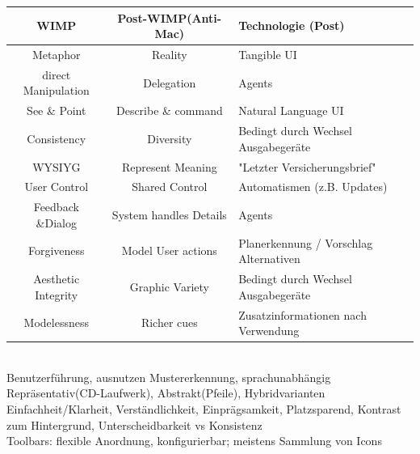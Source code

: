 \begin{tabular}{|c|c|l|}
\hline
\textbf{WIMP} & \textbf{Post-WIMP}(Anti-Mac) & \textbf{Technologie} (Post)\\
\hline
Metaphor & Reality & Tangible UI\\
\hline
direct Manipulation & Delegation & Agents\\ \hline
See \& Point & Describe \& command & Natural Language UI\\ \hline
Consistency & Diversity & Bedingt durch Wechsel Ausgabegeräte \\ \hline
WYSIYG & Represent Meaning & "Letzter Versicherungsbrief" \\ \hline
User Control & Shared Control & Automatismen (z.B. Updates) \\ \hline
Feedback \&Dialog & System handles Details & Agents\\ \hline
Forgiveness & Model User actions & Planerkennung / Vorschlag Alternativen \\ \hline
Aesthetic Integrity & Graphic Variety & Bedingt durch Wechsel Ausgabegeräte  \\ \hline
Modelessness & Richer cues & Zusatzinformationen nach Verwendung \\ \hline
\end{tabular}\\


Benutzerführung, ausnutzen Mustererkennung, sprachunabhängig\\
 Repräsentativ(CD-Laufwerk), Abstrakt(Pfeile), Hybridvarianten\\
 Einfachheit/Klarheit, Verständlichkeit, Einprägsamkeit, Platzsparend, Kontrast zum Hintergrund, Unterscheidbarkeit vs Konsistenz\\
Toolbars: flexible Anordnung, konfigurierbar; meistens Sammlung von Icons


